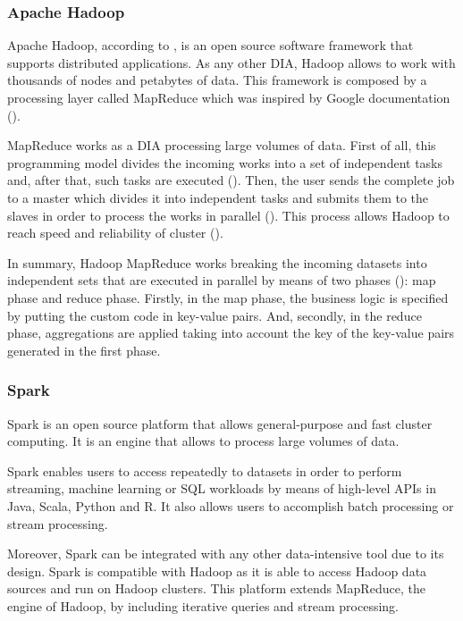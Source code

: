 \subsubsection{Apache Hadoop}

Apache Hadoop, according to \cite{hadoopwebsite}, is an open source software framework that supports distributed applications. As any other DIA, Hadoop allows to work with thousands of nodes and petabytes of data. This framework is composed by a processing layer called MapReduce which was inspired by Google documentation (\cite{hadoopwebsite}).

MapReduce works as a DIA processing large volumes of data. First of all, this programming model divides the incoming works into a set of independent tasks and, after that, such tasks are executed (\cite{hadoopwebsite}). Then, the user sends the complete job to a master which divides it into independent tasks and submits them to the slaves in order to process the works in parallel (\cite{hadoopwebsite}). This process allows Hadoop to reach speed and reliability of cluster (\cite{hadoopwebsite}).

In summary, Hadoop MapReduce works breaking the incoming datasets into independent sets that are executed in parallel by means of two phases (\cite{hadoopwebsite}): map phase and reduce phase. Firstly, in the map phase, the business logic is specified by putting the custom code in key-value pairs. And, secondly, in the reduce phase, aggregations are applied taking into account the key of the key-value pairs generated in the first phase.

\subsubsection{Spark}

Spark is an open source platform that allows general-purpose and fast cluster computing. It is an engine that allows to process large volumes of data.

Spark enables users to access repeatedly to datasets in order to perform streaming, machine learning or SQL workloads by means of high-level APIs in Java, Scala, Python and R. It also allows users to accomplish batch processing or stream processing.

Moreover, Spark can be integrated with any other data-intensive tool due to its design. Spark is compatible with Hadoop as it is able to access Hadoop data sources and run on Hadoop clusters. This platform extends MapReduce, the engine of Hadoop, by including iterative queries and stream processing.

